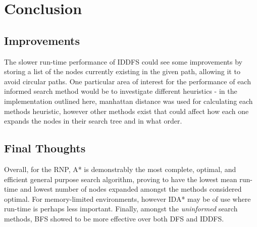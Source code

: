 \section{Conclusion} %
\label{sec:conclusion}

\subsection{Improvements} %
\label{sub:improvements}
The slower run-time performance of IDDFS could see some improvements by storing a list of the nodes currently existing in the given path, allowing it to avoid circular paths. One particular area of interest for the performance of each informed search method would be to investigate different heuristics - in the implementation outlined here, manhattan distance was used for calculating each methods heuristic, however other methods exist that could affect how each one expands the nodes in their search tree and in what order.

\subsection{Final Thoughts} %
\label{sub:final_thoughts}
Overall, for the RNP, A* is demonstrably the most complete, optimal, and efficient general purpose search algorithm, proving to have the lowest mean run-time and lowest number of nodes expanded amongst the methods considered optimal. For memory-limited environments, however IDA* may be of use where run-time is perhaps less important. Finally, amongst the \textit{uninformed} search methods, BFS showed to be more effective over both DFS and IDDFS.

